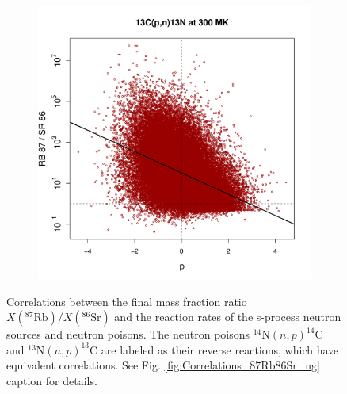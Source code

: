\begin{figure}[t]
\begin{subfigure}[b]{0.495\textwidth}
\end{subfigure}
\hfill
\begin{subfigure}[b]{0.495\textwidth}   
\centering 
\includegraphics[width=\textwidth]{Chapter-3/figs/CorrRB87SR86_13C_p_n_13N_300MK.png}
\end{subfigure}
\caption{\label{fig:Correlations_87Rb86Sr_n}Correlations between the final mass fraction ratio $X(^{87}\mathrm{Rb})/X(^{86}\mathrm{Sr})$ and the reaction rates of the s-process neutron sources and neutron poisons. The neutron poisons $^{14}\mathrm{N}(n,p)^{14}\mathrm{C}$ and $^{13}\mathrm{N}(n,p)^{13}\mathrm{C}$ are labeled as their reverse reactions, which have equivalent correlations. See Fig. \ref{fig:Correlations_87Rb86Sr_ng} caption for details.}
\end{figure}

